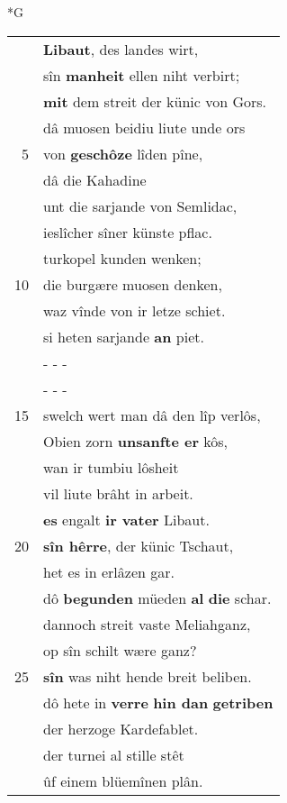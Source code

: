 \documentclass[8pt,a4paper,notitlepage]{article}
\begin{document}
\newpage
\begin{table}[ht]
\begin{minipage}[t]{0.5\linewidth}
\small
\begin{center}*G
\end{center}
\begin{tabular}{rl}
 & \textbf{Libaut}, des landes wirt,\\ 
 & sîn \textbf{manheit} ellen niht verbirt;\\ 
 & \textbf{mit} dem streit der künic von Gors.\\ 
 & dâ muosen beidiu liute unde ors\\ 
5 & von \textbf{geschôze} lîden pîne,\\ 
 & dâ die Kahadine\\ 
 & unt die sarjande von Semlidac,\\ 
 & ieslîcher sîner künste pflac.\\ 
 & turkopel kunden wenken;\\ 
10 & die burgære muosen denken,\\ 
 & waz vînde von ir letze schiet.\\ 
 & si heten sarjande \textbf{an} piet.\\ 
 & \multicolumn{1}{l}{ - - - }\\ 
 & \multicolumn{1}{l}{ - - - }\\ 
15 & swelch wert man dâ den lîp verlôs,\\ 
 & Obien zorn \textbf{unsanfte er} kôs,\\ 
 & wan ir tumbiu lôsheit\\ 
 & vil liute brâht in arbeit.\\ 
 & \textbf{es} engalt \textbf{ir vater} Libaut.\\ 
20 & \textbf{sîn hêrre}, der künic Tschaut,\\ 
 & het es in erlâzen gar.\\ 
 & dô \textbf{begunden} müeden \textbf{al} \textbf{die} schar.\\ 
 & dannoch streit vaste Meliahganz,\\ 
 & op sîn schilt wære ganz?\\ 
25 & \textbf{sîn} was niht hende breit beliben.\\ 
 & dô hete in \textbf{verre} \textbf{hin dan} \textbf{getriben}\\ 
 & der herzoge Kardefablet.\\ 
 & der turnei al stille stêt\\ 
 & ûf einem blüemînen plân.\\ 

\end{tabular}
\end{minipage}
\end{table}
\end{document}
